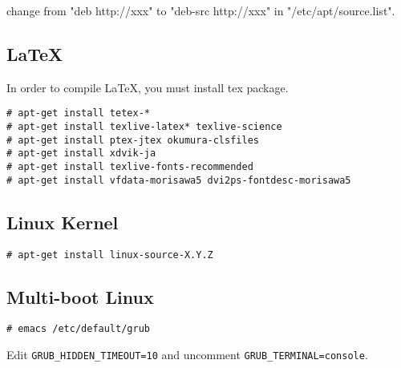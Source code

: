 change from "deb http://xxx" to "deb-src http://xxx" in "/etc/apt/source.list".


\subsection{LaTeX}

In order to compile LaTeX, you must install tex package.

\noindent
\begin{Sbox}
\begin{minipage}[t]{0.975\linewidth}
\begin{verbatim}
# apt-get install tetex-*
# apt-get install texlive-latex* texlive-science
# apt-get install ptex-jtex okumura-clsfiles
# apt-get install xdvik-ja
# apt-get install texlive-fonts-recommended
# apt-get install vfdata-morisawa5 dvi2ps-fontdesc-morisawa5
\end{verbatim}
\end{minipage}
\end{Sbox}
\fbox{\TheSbox}


\subsection{Linux Kernel}

\noindent
\begin{Sbox}
\begin{minipage}[t]{0.975\linewidth}
\begin{verbatim}
# apt-get install linux-source-X.Y.Z
\end{verbatim}
\end{minipage}
\end{Sbox}
\fbox{\TheSbox}

\subsection{Multi-boot Linux}

\noindent
\begin{Sbox}
\begin{minipage}[t]{0.975\linewidth}
\begin{verbatim}
# emacs /etc/default/grub
\end{verbatim}
\end{minipage}
\end{Sbox}
\fbox{\TheSbox}

Edit \verb|GRUB_HIDDEN_TIMEOUT=10| and uncomment
\verb|GRUB_TERMINAL=console|.



